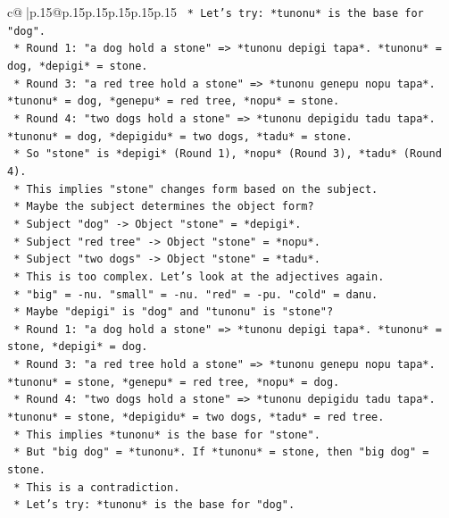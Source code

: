 \documentclass{article}
\begin{document}
{\begin{supertabular}{c@{$\;$}|p{.15\linewidth}@{}p{.15\linewidth}p{.15\linewidth}p{.15\linewidth}p{.15\linewidth}p{.15\linewidth}}
{{{\texttt{        *   Let's try: *tunonu* is the base for "dog".} \\
\texttt{        *   Round 1: "a dog hold a stone" => *tunonu depigi tapa*. *tunonu* = dog, *depigi* = stone.} \\
\texttt{        *   Round 3: "a red tree hold a stone" => *tunonu genepu nopu tapa*. *tunonu* = dog, *genepu* = red tree, *nopu* = stone.} \\
\texttt{        *   Round 4: "two dogs hold a stone" => *tunonu depigidu tadu tapa*. *tunonu* = dog, *depigidu* = two dogs, *tadu* = stone.} \\
\texttt{        *   So "stone" is *depigi* (Round 1), *nopu* (Round 3), *tadu* (Round 4).} \\
\texttt{        *   This implies "stone" changes form based on the subject.} \\
\texttt{        *   Maybe the subject determines the object form?} \\
\texttt{        *   Subject "dog" {-}> Object "stone" = *depigi*.} \\
\texttt{        *   Subject "red tree" {-}> Object "stone" = *nopu*.} \\
\texttt{        *   Subject "two dogs" {-}> Object "stone" = *tadu*.} \\
\texttt{        *   This is too complex. Let's look at the adjectives again.} \\
\texttt{        *   "big" = {-}nu. "small" = {-}nu. "red" = {-}pu. "cold" = danu.} \\
\texttt{        *   Maybe "depigi" is "dog" and "tunonu" is "stone"?} \\
\texttt{        *   Round 1: "a dog hold a stone" => *tunonu depigi tapa*. *tunonu* = stone, *depigi* = dog.} \\
\texttt{        *   Round 3: "a red tree hold a stone" => *tunonu genepu nopu tapa*. *tunonu* = stone, *genepu* = red tree, *nopu* = dog.} \\
\texttt{        *   Round 4: "two dogs hold a stone" => *tunonu depigidu tadu tapa*. *tunonu* = stone, *depigidu* = two dogs, *tadu* = red tree.} \\
\texttt{        *   This implies *tunonu* is the base for "stone".} \\
\texttt{        *   But "big dog" = *tunonu*. If *tunonu* = stone, then "big dog" = stone.} \\
\texttt{        *   This is a contradiction.} \\
\texttt{        *   Let's try: *tunonu* is the base for "dog".} \\
}}}
\end{supertabular}}
\end{document}
